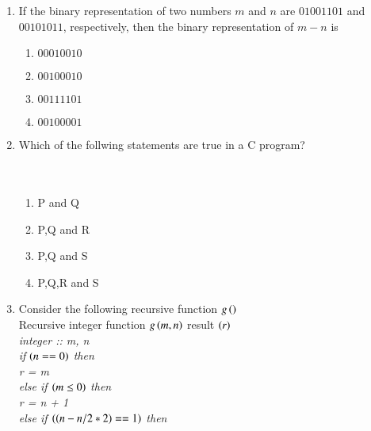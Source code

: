 \documentclass[journal]{IEEEtran}
\begin{document}
\begin{enumerate}
{\begin{multicols}{4}
\begin{enumerate}
\item $\sqrt{a}$
\item $a$
\item $a\sqrt{a}$
\item $a^2$
\end{enumerate}
\end{multicols}
}
\item{
If the binary representation of two numbers $m$ and $n$ are $01001101$ and $00101011$, respectively, then the binary representation of $m-n$ is 
\begin{multicols}{4}
\begin{enumerate}
\item $00010010$
\item $00100010$
\item $00111101$
\item $00100001$
\end{enumerate}
\end{multicols}
}
\item{
Which of the follwing statements are true in a C program?
\\
\\
\\
\begin{multicols}{4}
\begin{enumerate}
\item P and Q
\item P,Q and R
\item P,Q and S
\item P,Q,R and S
\end{enumerate}
\end{multicols}
}
\item{
Consider the following recursive function $g\left(\right)$\\
Recursive integer function $g\left(m, n\right)$ result $\left(r\right)$\\
    \textit{integer :: m, n\\
    if $\left(n == 0\right)$ then\\
        r = m\\
    else if $\left(m \leq 0\right)$ then\\
        r = n + 1\\
    else if $\left(\left(n - n / 2 * 2\right) == 1\right)$ then\\
}}
\end{enumerate}
\end{document}
